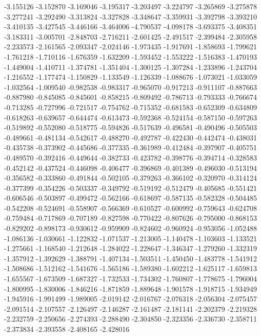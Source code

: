 -3.155126
-3.152870
-3.169046
-3.195317
-3.203497
-3.224797
-3.265869
-3.275878
-3.277241
-3.292490
-3.313824
-3.327828
-3.348647
-3.359931
-3.392798
-3.393210
-3.410135
-3.427545
-3.446166
-3.464006
-4.790537
-4.098178
-3.693375
-3.408351
-3.183311
-3.005701
-2.848703
-2.716211
-2.601425
-2.491517
-2.399484
-2.305958
-2.233573
-2.161565
-2.093347
-2.024146
-1.973435
-1.917691
-1.858693
-1.799621
-1.761218
-1.710116
-1.676359
-1.632209
-1.593452
-1.553222
-1.516383
-1.470193
-1.449004
-1.410711
-1.374781
-1.351404
-1.300125
-1.307284
-1.233896
-1.243704
-1.216552
-1.177474
-1.150829
-1.133549
-1.126339
-1.088676
-1.073021
-1.033059
-1.032564
-1.009540
-0.982538
-0.983317
-0.965070
-0.917213
-0.911107
-0.887663
-0.887980
-0.845085
-0.845601
-0.858215
-0.809492
-0.786713
-0.793333
-0.766674
-0.713285
-0.727996
-0.721517
-0.754762
-0.715352
-0.681583
-0.652309
-0.634809
-0.618263
-0.639657
-0.644474
-0.613473
-0.592368
-0.524154
-0.587150
-0.597263
-0.519892
-0.552080
-0.518775
-0.594826
-0.517639
-0.496581
-0.490496
-0.505503
-0.489661
-0.481134
-0.542617
-0.488270
-0.492787
-0.422430
-0.442474
-0.438031
-0.435738
-0.373902
-0.445686
-0.377335
-0.361989
-0.412484
-0.397907
-0.405751
-0.489570
-0.392416
-0.449644
-0.382733
-0.423782
-0.398776
-0.394714
-0.328583
-0.452142
-0.437524
-0.446098
-0.406477
-0.396869
-0.401389
-0.496030
-0.513194
-0.356582
-0.333860
-0.491844
-0.502105
-0.379263
-0.366102
-0.320970
-0.314124
-0.377399
-0.354226
-0.503337
-0.349792
-0.519192
-0.512479
-0.405685
-0.551421
-0.606546
-0.503897
-0.499472
-0.562166
-0.618697
-0.587135
-0.582328
-0.504485
-0.542208
-0.524691
-0.558907
-0.566369
-0.610527
-0.600992
-0.759643
-0.624708
-0.759484
-0.717869
-0.707189
-0.827598
-0.770422
-0.807626
-0.795000
-0.868153
-0.829202
-0.898173
-0.930612
-0.959909
-0.824602
-0.960924
-0.953056
-1.052488
-1.086136
-1.030661
-1.122832
-1.071537
-1.213005
-1.140478
-1.103603
-1.133521
-1.275661
-1.168540
-1.212648
-1.284022
-1.228647
-1.346347
-1.279260
-1.332319
-1.357912
-1.392629
-1.388791
-1.407134
-1.503511
-1.450450
-1.483778
-1.541912
-1.508686
-1.512162
-1.541676
-1.565186
-1.589380
-1.602212
-1.625117
-1.659813
-1.655567
-1.673509
-1.687327
-1.732533
-1.734302
-1.760807
-1.778675
-1.796004
-1.800995
-1.830006
-1.846216
-1.871859
-1.889648
-1.901578
-1.918715
-1.934949
-1.945916
-1.991499
-1.989005
-2.019142
-2.016767
-2.076318
-2.056304
-2.075457
-2.091514
-2.107557
-2.126497
-2.146287
-2.161487
-2.181141
-2.202379
-2.219328
-2.232759
-2.250656
-2.274393
-2.288490
-2.304850
-2.323356
-2.336730
-2.358711
-2.373834
-2.393558
-2.408165
-2.428016
